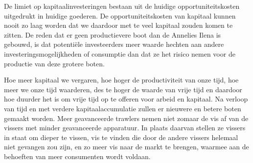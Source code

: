 De limiet op kapitaalinvesteringen bestaan uit de huidige opportuniteitskosten uitgedrukt in huidige goederen. De opportuniteitskosten van kapitaal kunnen nooit zo laag worden dat we daardoor met te veel kapitaal zouden komen te zitten. De reden dat er geen productievere boot dan de Annelies Ilena is gebouwd, is dat potentiële investeerders meer waarde hechten aan andere investeringsmogelijkheden of consumptie dan dat ze het risico nemen voor de productie van deze grotere boten.

Hoe meer kapitaal we vergaren, hoe hoger de productiviteit van onze tijd, hoe meer we onze tijd waarderen, des te hoger de waarde van vrije tijd en daardoor hoe duurder het is om vrije tijd op te offeren voor arbeid en kapitaal. Na verloop van tijd en met verdere kapitaalaccumulatie zullen er nieuwere en betere boten gemaakt worden. Meer geavanceerde trawlers nemen niet zomaar de vis af van de vissers met minder geavanceerde apparatuur. In plaats daarvan stellen ze vissers in staat om dieper te vissen, vis te vinden die door de andere vissers helemaal niet gevangen zou zijn, en zo meer vis naar de markt te brengen, waarmee aan de behoeften van meer consumenten wordt voldaan.
